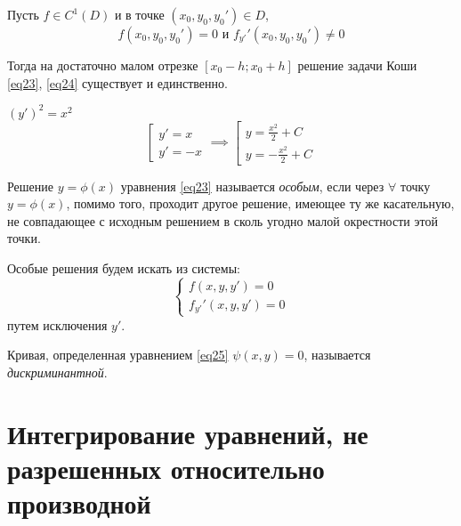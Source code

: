 \begin{theorem}
    Пусть $f\in C^1(D)$ и в точке $(x_0,y_0,y_0') \in D$,
    \[
        f(x_0,y_0,y_0') = 0\text{ и }f_{y'}'(x_0,y_0,y_0')\ne0
    \]

    Тогда на достаточно малом отрезке $[x_0 - h;x_0 + h]$ решение задачи Коши \ref{eq23}, \ref{eq24} существует и единственно.
\end{theorem}

\begin{example}
    $(y')^2 = x^2$
    \[
        \left[\begin{array}{l}
            y' = x \\
            y' = -x
        \end{array}\right. \implies \left[\begin{array}{l}
            y = \frac{x^2}{2} + C \\
            y = - \frac{x^2}{2} + C
        \end{array}\right.
    \]
\end{example}

\begin{definition}
    Решение $y = \phi(x)$ уравнения \ref{eq23} называется \emph{особым}, если через $\forall$ точку $y = \phi(x)$, помимо того, проходит другое решение, имеющее ту же касательную, не совпадающее с исходным решением в сколь угодно малой окрестности этой точки.

    Особые решения будем искать из системы:
    \begin{equation}\label{eq25}
        \left\{\begin{array}{l}
            f(x,y,y') = 0 \\
            f_{y'}'(x,y,y') = 0
        \end{array}\right.
    \end{equation}
    путем исключения $y'$.

    Кривая, определенная уравнением \ref{eq25} $\psi(x,y) = 0$, называется \emph{дискриминантной}.
\end{definition}

\section{Интегрирование уравнений, не разрешенных относительно производной}

